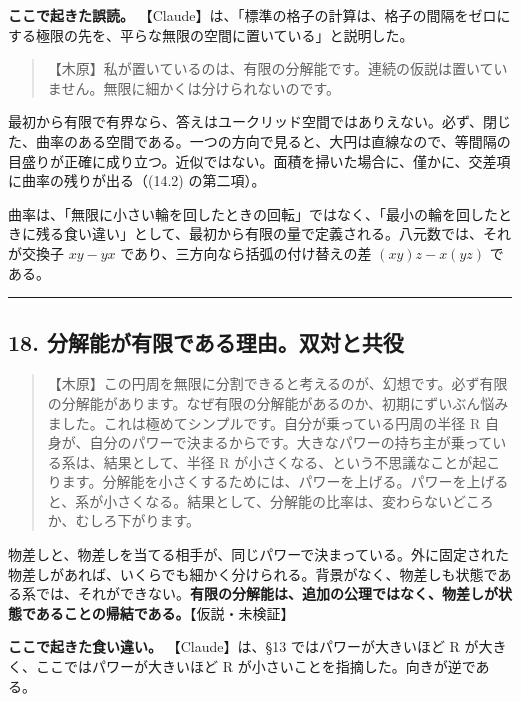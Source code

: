 \documentclass[
  a4paper,
]{ltjsarticle}
\begin{document}
\textbf{ここで起きた誤読。}
【Claude】は、「標準の格子の計算は、格子の間隔をゼロにする極限の先を、平らな無限の空間に置いている」と説明した。

\begin{quote}
【木原】私が置いているのは、有限の分解能です。連続の仮説は置いていません。無限に細かくは分けられないのです。
\end{quote}

最初から有限で有界なら、答えはユークリッド空間ではありえない。必ず、閉じた、曲率のある空間である。一つの方向で見ると、大円は直線なので、等間隔の目盛りが正確に成り立つ。近似ではない。面積を掃いた場合に、僅かに、交差項に曲率の残りが出る（(14.2)
の第二項）。

曲率は、「無限に小さい輪を回したときの回転」ではなく、「最小の輪を回したときに残る食い違い」として、最初から有限の量で定義される。八元数では、それが交換子
\(xy - yx\) であり、三方向なら括弧の付け替えの差 \((xy)z - x(yz)\)
である。

\begin{center}\rule{0.5\linewidth}{0.5pt}\end{center}

\subsection{18.
分解能が有限である理由。双対と共役}\label{ux5206ux89e3ux80fdux304cux6709ux9650ux3067ux3042ux308bux7406ux7531ux53ccux5bfeux3068ux5171ux5f79}

\begin{quote}
【木原】この円周を無限に分割できると考えるのが、幻想です。必ず有限の分解能があります。なぜ有限の分解能があるのか、初期にずいぶん悩みました。これは極めてシンプルです。自分が乗っている円周の半径
R
自身が、自分のパワーで決まるからです。大きなパワーの持ち主が乗っている系は、結果として、半径
R
が小さくなる、という不思議なことが起こります。分解能を小さくするためには、パワーを上げる。パワーを上げると、系が小さくなる。結果として、分解能の比率は、変わらないどころか、むしろ下がります。
\end{quote}

物差しと、物差しを当てる相手が、同じパワーで決まっている。外に固定された物差しがあれば、いくらでも細かく分けられる。背景がなく、物差しも状態である系では、それができない。\textbf{有限の分解能は、追加の公理ではなく、物差しが状態であることの帰結である。}【仮説・未検証】

\textbf{ここで起きた食い違い。} 【Claude】は、§13 ではパワーが大きいほど
R が大きく、ここではパワーが大きいほど R
が小さいことを指摘した。向きが逆である。
\end{document}
